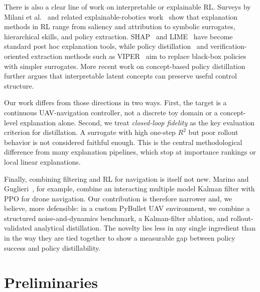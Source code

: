 \documentclass[runningheads]{llncs}
\begin{document}
There is also a clear line of work on interpretable or explainable RL. Surveys by Milani et al.~\cite{Milani2022XRL} and related explainable-robotics work~\cite{Lee2023AdaptiveExplainable} show that explanation methods in RL range from saliency and attribution to symbolic surrogates, hierarchical skills, and policy extraction. SHAP~\cite{Lundberg2017SHAP} and LIME~\cite{Ribeiro2016LIME} have become standard post hoc explanation tools, while policy distillation~\cite{Rusu2015PolicyDistillation} and verification-oriented extraction methods such as VIPER~\cite{Bastani2018VIPER} aim to replace black-box policies with simpler surrogates. More recent work on concept-based policy distillation~\cite{Bekkemoen2025ConceptDistill} further argues that interpretable latent concepts can preserve useful control structure.

Our work differs from those directions in two ways. First, the target is a continuous UAV-navigation controller, not a discrete toy domain or a concept-level explanation alone. Second, we treat \emph{closed-loop fidelity} as the key evaluation criterion for distillation. A surrogate with high one-step $R^2$ but poor rollout behavior is not considered faithful enough. This is the central methodological difference from many explanation pipelines, which stop at importance rankings or local linear explanations.

Finally, combining filtering and RL for navigation is itself not new. Marino and Guglieri~\cite{Marino2024KalmanRL}, for example, combine an interacting multiple model Kalman filter with PPO for drone navigation. Our contribution is therefore narrower and, we believe, more defensible: in a custom PyBullet UAV environment, we combine a structured noise-and-dynamics benchmark, a Kalman-filter ablation, and rollout-validated analytical distillation. The novelty lies less in any single ingredient than in the way they are tied together to show a measurable gap between policy success and policy distillability.

\section{Preliminaries}
\end{document}

